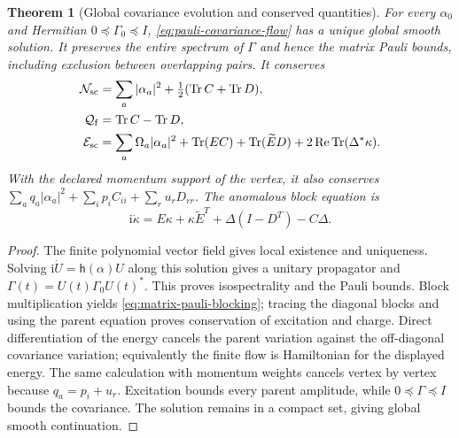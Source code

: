 \documentclass[11pt,a4paper,oneside]{book}
\theoremstyle{plain}
\newtheorem{theorem}{Theorem}[chapter]
\theoremstyle{definition}
\theoremstyle{remark}
\newcommand{\ii}{\mathrm i}
\newcommand{\Tr}{\operatorname{Tr}}
\newcommand{\src}[2]{\cite{#1}}
\begin{document}
\begin{theorem}[Global covariance evolution and conserved quantities]
\label{thm:pauli-covariance-flow}
For every $\alpha_0$ and Hermitian $0\preceq\Gamma_0\preceq I$,
\eqref{eq:pauli-covariance-flow} has a unique global smooth solution.
It preserves the entire spectrum of $\Gamma$ and hence the matrix
Pauli bounds, including exclusion between overlapping pairs.  It
conserves
\begin{equation}
 \begin{split}
 \mathcal N_{\rm sc}&=\sum_a|\alpha_a|^2+\tfrac12(\Tr C+\Tr D),\\
 \mathcal Q_{\rm f}&=\Tr C-\Tr D,\\
 \mathcal E_{\rm sc}&=\sum_a\Omega_a|\alpha_a|^2+
 \Tr(EC)+\Tr(\widetilde E D)+2\operatorname{Re}\Tr(\Delta^*\kappa).
 \end{split}
 \label{eq:covariance-invariants}
\end{equation}
With the declared momentum support of the vertex, it also conserves
$\sum_aq_a|\alpha_a|^2+\sum_i p_iC_{ii}+\sum_r u_rD_{rr}$.
The anomalous block equation is
\begin{equation}
 \ii\dot\kappa=E\kappa+\kappa\widetilde E^T
                  +\Delta(I-D^T)-C\Delta.
 \label{eq:matrix-pauli-blocking}
\end{equation}
\end{theorem}
\begin{proof}
The finite polynomial vector field gives local existence and
uniqueness.  Solving $\ii\dot U=\mathsf h(\alpha)U$ along this
solution gives a unitary propagator and
$\Gamma(t)=U(t)\Gamma_0U(t)^*$.  This proves isospectrality and the
Pauli bounds.  Block multiplication yields
\eqref{eq:matrix-pauli-blocking}; tracing the diagonal blocks and
using the parent equation proves conservation of excitation and
charge.  Direct differentiation of the energy cancels the parent
variation against the off-diagonal covariance variation; equivalently
the finite flow is Hamiltonian for the displayed energy.  The same
calculation with momentum weights cancels vertex by vertex because
$q_a=p_i+u_r$.  Excitation bounds every parent amplitude, while
$0\preceq\Gamma\preceq I$ bounds the covariance.  The solution remains
in a compact set, giving global smooth continuation.
\end{proof}
\src{R20}{thm:v20v71-pauli,thm:v20v71-conservation}
\end{document}

